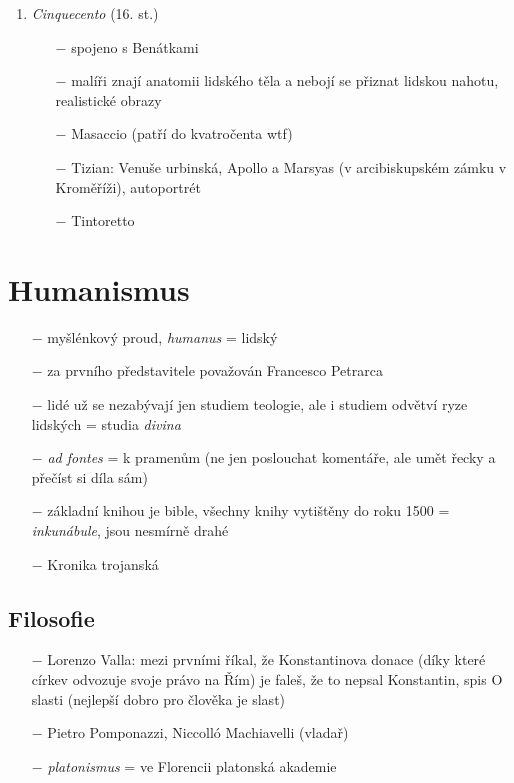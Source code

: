 \documentclass{article}
\begin{document}
\begin{enumerate}
\begin{itemize}
    \end{itemize}
    \item \textit{Cinquecento} (16. st.)
    \begin{itemize}
        \vspace{-0.5em}
        \setlength\itemsep{0.15em}
        \item[$-$] spojeno s Benátkami
        \item[$-$] malíři znají anatomii lidského těla a nebojí se přiznat lidskou nahotu, realistické obrazy
        \item[$-$] Masaccio (patří do kvatročenta wtf)
        \item[$-$] Tizian: Venuše urbinská, Apollo a Marsyas (v arcibiskupském zámku v Kroměříži), autoportrét
        \item[$-$] Tintoretto
    \end{itemize}
\end{enumerate}


\section*{Humanismus}
\begin{itemize}
    \vspace{-0.5em}
    \setlength\itemsep{0.15em}
    \item[$-$] myšlénkový proud, \textit{humanus} = lidský
    \item[$-$] za prvního představitele považován Francesco Petrarca
    \item[$-$] lidé už se nezabývají jen studiem teologie, ale i studiem odvětví ryze lidských = studia \textit{divina}
    \item[$-$] \textit{ad fontes} = k pramenům (ne jen poslouchat komentáře, ale umět řecky a přečíst si díla sám)
    \item[$-$] základní knihou je bible, všechny knihy vytištěny do roku 1500 = \textit{inkunábule}, jsou nesmírně drahé
    \item[$-$] Kronika trojanská
\end{itemize}

\subsection*{Filosofie}
\begin{itemize}
    \vspace{-0.5em}
    \setlength\itemsep{0.15em}
    \item[$-$] Lorenzo Valla: mezi prvními říkal, že Konstantinova donace (díky které církev odvozuje svoje právo na Řím) je faleš, že to nepsal Konstantin, spis O slasti (nejlepší dobro pro člověka je slast)
    \item[$-$] Pietro Pomponazzi, Niccolló Machiavelli (vladař)
    \item[$-$] \textit{platonismus} = ve Florencii platonská akademie
\end{itemize}
\end{document}
